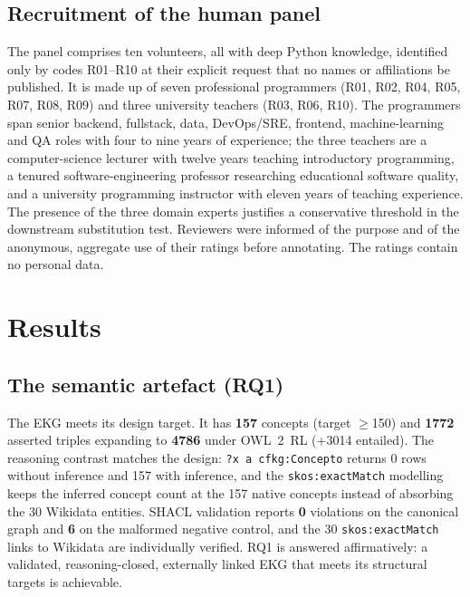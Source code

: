 \documentclass[sageh]{sagej}
\begin{document}
\subsection{Recruitment of the human panel}
The panel comprises ten volunteers, all with deep Python knowledge, identified only by codes R01--R10 at their explicit request that no names or affiliations be published. It is made up of seven professional programmers (R01, R02, R04, R05, R07, R08, R09) and three university teachers (R03, R06, R10). The programmers span senior backend, fullstack, data, DevOps/SRE, frontend, machine-learning and QA roles with four to nine years of experience; the three teachers are a computer-science lecturer with twelve years teaching introductory programming, a tenured software-engineering professor researching educational software quality, and a university programming instructor with eleven years of teaching experience. The presence of the three domain experts justifies a conservative threshold in the downstream substitution test. Reviewers were informed of the purpose and of the anonymous, aggregate use of their ratings before annotating. The ratings contain no personal data.

\section{Results}

\subsection{The semantic artefact (RQ1)}
The EKG meets its design target. It has \textbf{157} concepts (target $\geq$150) and \textbf{1772} asserted triples expanding to \textbf{4786} under OWL~2~RL (+3014 entailed). The reasoning contrast matches the design: \texttt{?x a cfkg:Concepto} returns 0 rows without inference and 157 with inference, and the \texttt{skos:exactMatch} modelling keeps the inferred concept count at the 157 native concepts instead of absorbing the 30 Wikidata entities. SHACL validation reports \textbf{0} violations on the canonical graph and \textbf{6} on the malformed negative control, and the 30 \texttt{skos:exactMatch} links to Wikidata are individually verified. RQ1 is answered affirmatively: a validated, reasoning-closed, externally linked EKG that meets its structural targets is achievable.
\end{document}
